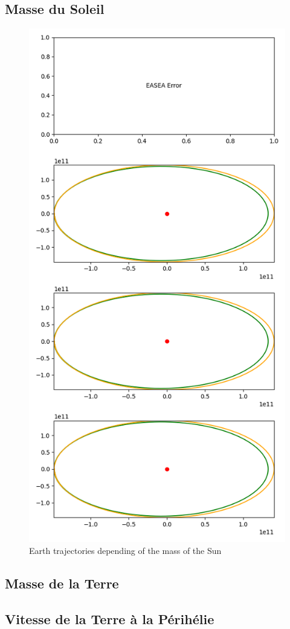 \subsection{Masse du Soleil}

\begin{figure}[H]
    \center
    \includegraphics[scale=.3]{img/sun_mass.png}
    \caption{Earth trajectories depending of the mass of the Sun}
\end{figure}

\subsection{Masse de la Terre}

\subsection{Vitesse de la Terre à la Périhélie}

